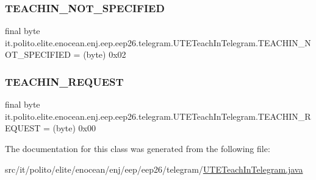 \subsubsection{\texorpdfstring{T\+E\+A\+C\+H\+I\+N\+\_\+\+N\+O\+T\+\_\+\+S\+P\+E\+C\+I\+F\+I\+ED}{TEACHIN\_NOT\_SPECIFIED}}
{\footnotesize\ttfamily final byte it.\+polito.\+elite.\+enocean.\+enj.\+eep.\+eep26.\+telegram.\+U\+T\+E\+Teach\+In\+Telegram.\+T\+E\+A\+C\+H\+I\+N\+\_\+\+N\+O\+T\+\_\+\+S\+P\+E\+C\+I\+F\+I\+ED = (byte) 0x02\hspace{0.3cm}{\ttfamily [static]}}

\hypertarget{classit_1_1polito_1_1elite_1_1enocean_1_1enj_1_1eep_1_1eep26_1_1telegram_1_1_u_t_e_teach_in_telegram_ae59af28efc44bc9bb76ce6d584fe9012}{}\label{classit_1_1polito_1_1elite_1_1enocean_1_1enj_1_1eep_1_1eep26_1_1telegram_1_1_u_t_e_teach_in_telegram_ae59af28efc44bc9bb76ce6d584fe9012} 
\subsubsection{\texorpdfstring{T\+E\+A\+C\+H\+I\+N\+\_\+\+R\+E\+Q\+U\+E\+ST}{TEACHIN\_REQUEST}}
{\footnotesize\ttfamily final byte it.\+polito.\+elite.\+enocean.\+enj.\+eep.\+eep26.\+telegram.\+U\+T\+E\+Teach\+In\+Telegram.\+T\+E\+A\+C\+H\+I\+N\+\_\+\+R\+E\+Q\+U\+E\+ST = (byte) 0x00\hspace{0.3cm}{\ttfamily [static]}}



The documentation for this class was generated from the following file\+:\begin{DoxyCompactItemize}
\item 
src/it/polito/elite/enocean/enj/eep/eep26/telegram/\hyperlink{_u_t_e_teach_in_telegram_8java}{U\+T\+E\+Teach\+In\+Telegram.\+java}\end{DoxyCompactItemize}
